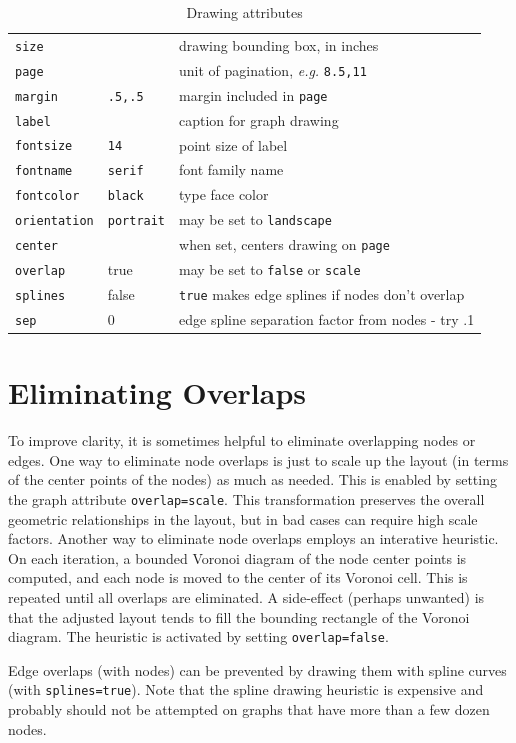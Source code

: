 \documentclass[11pt]{article}
\begin{document}
\begin{table}
\begin{tabular}[t]{|l|l|p{3.5in}|}
{\tt size} & & drawing bounding box, in inches \\
{\tt page} & & unit of pagination, {\it e.g.} {\tt 8.5,11} \\
{\tt margin} & {\tt .5,.5} & margin included in {\tt page} \\
{\tt label} & & caption for graph drawing \\
{\tt fontsize} & {\tt 14} & point size of label \\
{\tt fontname} & {\tt serif} & font family name \\
{\tt fontcolor} & {\tt black} & type face color \\ 
{\tt orientation} & {\tt portrait} & may be set to {\tt landscape} \\ 
{\tt center} & & when set, centers drawing on {\tt page} \\ \hline
{\tt overlap} & true & may be set to {\tt false} or {\tt scale} \\ \hline
{\tt splines} & false & {\tt true} makes edge splines if nodes don't overlap \\ \hline
{\tt sep} & 0 & edge spline separation factor from nodes - try .1 \\ \hline
\end{tabular}
\caption{Drawing attributes}
\label{table:attrs}
\end{table}

\section{Eliminating Overlaps}
To improve clarity, it is sometimes helpful to eliminate 
overlapping nodes or edges. One way to eliminate node overlaps
is just to scale up the layout (in terms of the center points
of the nodes) as much as needed.  This is enabled by setting
the graph attribute {\tt overlap=scale}.  This transformation
preserves the overall geometric relationships in the layout,
but in bad cases can require high scale factors.  Another way
to eliminate node overlaps employs an interative heuristic.
On each iteration, a bounded Voronoi diagram of the node center points
is computed, and each node is moved to the center of its Voronoi cell.
This is repeated until all overlaps are eliminated.  A side-effect
(perhaps unwanted) is that the adjusted layout tends to fill the
bounding rectangle of the Voronoi diagram.  The heuristic is activated
by setting {\tt overlap=false}.

Edge overlaps (with nodes) can be prevented by drawing them
with spline curves (with {\tt splines=true}). Note that the spline
drawing heuristic is expensive and probably should not be attempted
on graphs that have more than a few dozen nodes.
\end{document}
